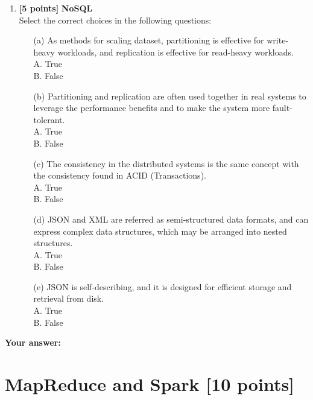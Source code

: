 \documentclass[10pt]{article}
\begin{document}
\begin{enumerate}
	\item \textbf{[5 points]} \textbf{NoSQL} \\
	      Select the correct choices in the following questions:
	      \begin{itemize}
		      \item[(a)] As methods for scaling dataset, partitioning is effective for write-heavy workloads, and replication is effective for read-heavy workloads.  \\
		            A. True \\
		            B. False \\
		      \item[(b)] Partitioning and replication are often used together in real systems to leverage the performance
		            benefits and to make the system more fault-tolerant. \\
		            A. True \\
		            B. False \\
		      \item[(c)] The consistency in the distributed systems is the same concept with the consistency found in ACID (Transactions). \\
		            A. True \\
		            B. False \\
		      \item[(d)] JSON and XML are referred as semi-structured data formats, and can express complex data structures, which may be arranged into nested structures. \\
		            A. True \\
		            B. False \\
		      \item[(e)] JSON is self-describing, and it is designed for efficient storage and retrieval from disk. \\
		            A. True \\
		            B. False \\
	      \end{itemize}

\end{enumerate}
\textbf{Your answer:}

\newpage
\section{MapReduce and Spark \textbf{[10 points]}}
\end{document}
